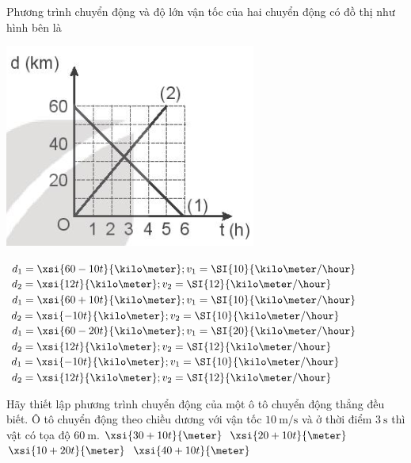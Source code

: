\begin{ex}
	Phương trình chuyển động và độ lớn vận tốc của hai chuyển động có đồ thị như hình bên là
	\begin{center}
		\includegraphics[scale=0.5]{figs/G10Y25B5-5}
	\end{center}
	\choice
	{\True $d_1=\xsi{60-10t}{\kilo\meter}; v_1=\SI{10}{\kilo\meter/\hour}$\\$d_2=\xsi{12t}{\kilo\meter}; v_2=\SI{12}{\kilo\meter/\hour}$}
	{$d_1=\xsi{60+10t}{\kilo\meter}; v_1=\SI{10}{\kilo\meter/\hour}$\\$d_2=\xsi{-10t}{\kilo\meter}; v_2=\SI{10}{\kilo\meter/\hour}$}
	{$d_1=\xsi{60-20t}{\kilo\meter}; v_1=\SI{20}{\kilo\meter/\hour}$\\$d_2=\xsi{12t}{\kilo\meter}; v_2=\SI{12}{\kilo\meter/\hour}$}
	{$d_1=\xsi{-10t}{\kilo\meter}; v_1=\SI{10}{\kilo\meter/\hour}$\\$d_2=\xsi{12t}{\kilo\meter}; v_2=\SI{12}{\kilo\meter/\hour}$}
\end{ex}

\begin{ex}
	Hãy thiết lập phương trình chuyển động của một ô tô chuyển động thẳng đều biết. Ô tô chuyển động theo chiều dương với vận tốc $\SI{10}{\meter/\second}$ và ở thời điểm $\SI{3}{\second}$ thì vật có tọa độ $\SI{60}{\meter}$.
	\choice
	{\True $\xsi{30+10t}{\meter}$}
	{$\xsi{20+10t}{\meter}$}
	{$\xsi{10+20t}{\meter}$}
	{$\xsi{40+10t}{\meter}$}
\end{ex}

